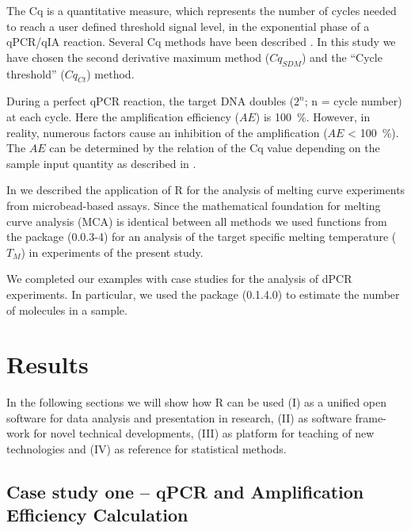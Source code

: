 The Cq is a quantitative measure, which represents the number of cycles 
needed to reach a user defined threshold signal level, in the exponential phase 
of a qPCR/qIA reaction. Several Cq methods have been described 
\citep{ruijter_2013}. In this study we have chosen the second derivative maximum 
method ($Cq_{SDM}$) and the ``Cycle threshold'' ($Cq_{Ct}$) method.

During a perfect qPCR reaction, the target DNA doubles ($2^{n}$; n = cycle 
number) at each cycle. Here the amplification efficiency ($AE$) is 100~\%. 
However, in reality, numerous factors cause an inhibition of the amplification 
($AE$ < 100~\%). The $AE$ can be determined by the relation of the Cq value 
depending on the sample input quantity as described in 
\citep{roediger_2015_Bioinformatics, svec_2015}.

In \citet{roediger_RJ_2013} we described the application of R for the analysis 
of melting curve experiments from microbead-based assays. Since the mathematical 
foundation for melting curve analysis (MCA) is identical between all methods
we used functions from the  package (0.0.3-4) for an 
analysis of the target specific melting temperature ($T_{M}$) in experiments of 
the present study.

We completed our examples with case studies for the analysis of dPCR 
experiments. In particular, we used the  package (0.1.4.0) to 
estimate the number of molecules in a sample.

\section{Results}

In the following sections we will show how R can be used (I) as a unified open 
software for data analysis and presentation in research, (II) as software 
frame-work for novel technical developments, (III) as platform for teaching of 
new technologies and (IV) as reference for statistical methods.

\subsection{Case study one -- qPCR and Amplification Efficiency Calculation}

